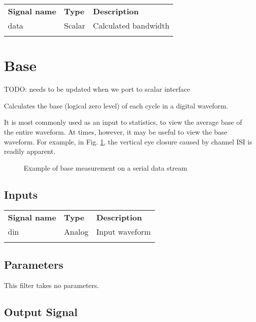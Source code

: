 \begin{tabularx}{16cm}{llX}
\thickhline
\textbf{Signal name} & \textbf{Type} & \textbf{Description} \\
\thickhline
data & Scalar & Calculated bandwidth \\
\thickhline
\end{tabularx}

\pagebreak
\section{Base}
\label{filter:base}

TODO: needs to be updated when we port to scalar interface

Calculates the base (logical zero level) of each cycle in a digital waveform.

It is most commonly used as an input to statistics, to view the average base of the entire waveform. At times, however,
it may be useful to view the base waveform. For example, in Fig. \ref{filter_base}, the vertical eye closure caused by
channel ISI is readily apparent.

\begin{figure}[h]
\centering
{}
\caption{Example of base measurement on a serial data stream}
\label{filter_base}
\end{figure}

\subsection{Inputs}

\begin{tabularx}{16cm}{llX}
\thickhline
\textbf{Signal name} & \textbf{Type} & \textbf{Description} \\
\thickhline
din & Analog & Input waveform \\
\thickhline
\end{tabularx}

\subsection{Parameters}

This filter takes no parameters.

\subsection{Output Signal}

